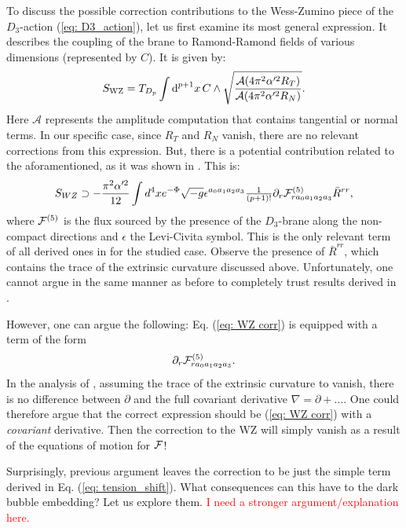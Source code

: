 To discuss the possible correction contributions to the Wess-Zumino piece of the $D_{3}$-action (\ref{eq: D3_action}), let us first examine its most general expression. It describes the coupling of the brane to Ramond-Ramond fields of various dimensions (represented by $C$). It is given by:
\begin{equation}
    S_{\rm WZ}= T_{D_p} \int \text{d}^{p+1} x \, C \wedge\sqrt{\frac{{\cal A}(4\pi^2 \alpha  '^{2} R_T)}{{\cal A}(4\pi^2 \alpha'^{2} R_N)}}.
\end{equation}
Here $\mathcal{A}$ represents the amplitude computation that contains tangential or normal terms. In our specific case, since $R_T$ and $R_N$ vanish, there are no relevant corrections from this expression. But, there is a potential contribution related to the aforamentioned, as it was shown in \cite{Jalali:2016aa}. This is:
\begin{equation} \label{eq: WZ corr}
    S_{WZ} \supset -\frac{\pi^2 \alpha'^{2}}{12} \int d^4 x e^{-\Phi} \sqrt{-g}\epsilon^{a_0 a_1 a_2 a_3}
    \tfrac{1}{(p+1)!}\partial _r {\cal F}^{(5)}_{r a_0 a_1 a_2 a_3} \bar{R}^{rr},
\end{equation}
where ${\cal F}^{(5)}$ is the flux sourced by the presence of the $D_{3}$-brane along the non-compact directions and $\epsilon$ the Levi-Civita symbol. This is the only relevant term of all derived ones in \cite{Jalali:2016aa} for the studied case. Observe the presence of $\bar{R}^{rr}$, which contains the trace of the extrinsic curvature discussed above. Unfortunately, one cannot argue in the same manner as before to completely trust results derived in \cite{Jalali:2016aa}.


However, one can argue the following: Eq. (\ref{eq: WZ corr}) is equipped with a term of the form
\begin{equation}
    \partial _r {\cal F}^{(5)}_{r a_0 a_1 a_2 a_3}.
\end{equation}
In the analysis of \cite{Jalali:2016aa}, assuming the trace of the extrinsic curvature to vanish, there is no difference between $\partial$ and the full covariant derivative $\nabla =\partial +...$. One could therefore argue that the correct expression should be (\ref{eq: WZ corr}) with a {\it covariant} derivative. Then the correction to the WZ will simply vanish as a result of the equations of motion for ${\cal F}$!

Surprisingly, previous argument leaves the correction to be just the simple term derived in Eq. (\ref{eq: tension_shift}). What consequences can this have to the dark bubble embedding? Let us explore them.
\textcolor{red}{I need a stronger argument/explanation here.}


